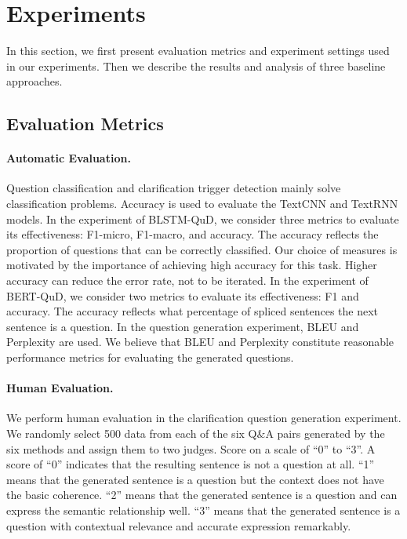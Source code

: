 \section{Experiments}
\label{experiments}

In this section, we first present evaluation metrics and experiment settings used in our experiments. Then we describe the results and analysis of three baseline approaches.

\subsection{Evaluation Metrics}
\paragraph{Automatic Evaluation.} 
Question classification and clarification trigger detection mainly solve classification problems. Accuracy is used to evaluate the TextCNN and TextRNN models. In the experiment of BLSTM-QuD, we consider three metrics to evaluate its effectiveness: F1-micro, F1-macro, and accuracy. The accuracy reflects the proportion of questions that can be correctly classified. Our choice of measures is motivated by the importance of achieving high accuracy for this task. Higher accuracy can reduce the error rate, not to be iterated. In the experiment of BERT-QuD, we consider two metrics to evaluate its effectiveness: F1 and accuracy. The accuracy reflects what percentage of spliced sentences the next sentence is a question. In the question generation experiment, BLEU and Perplexity are used. We believe that BLEU and Perplexity constitute reasonable performance metrics for evaluating the generated questions.

\paragraph{Human Evaluation.} 
We perform human evaluation in the clarification question generation experiment. We randomly select 500 data from each of the six Q$\&$A pairs generated by the six methods and assign them to two judges. Score on a scale of ``0'' to ``3''. A score of ``0'' indicates that the resulting sentence is not a question at all. ``1'' means that the generated sentence is a question but the context does not have the basic coherence. ``2'' means that the generated sentence is a question and can express the semantic relationship well. ``3'' means that the generated sentence is a question with contextual relevance and accurate expression remarkably.

